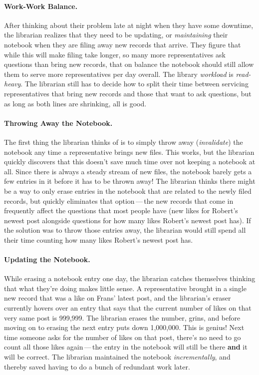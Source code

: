 \paragraph{Work-Work Balance.}
%
After thinking about their problem late at night when they have some downtime,
the librarian realizes that they need to be updating, or \textit{maintaining}
their notebook when they are filing away new records that arrive. They figure
that while this will make filing take longer, so many more representatives ask
questions than bring new records, that on balance the notebook should still
allow them to serve more representatives per day overall. The library
\textit{workload} is \textit{read-heavy}. The librarian still has to decide how
to split their time between servicing representatives that bring new records and
those that want to ask questions, but as long as both lines are shrinking, all
is good.

\paragraph{Throwing Away the Notebook.}
%
The first thing the librarian thinks of is to simply throw away
(\textit{invalidate}) the notebook any time a representative brings new files.
This works, but the librarian quickly discovers that this doesn't save much time
over not keeping a notebook at all. Since there is always a steady stream of new
files, the notebook barely gets a few entries in it before it has to be thrown
away! The librarian thinks there might be a way to only erase entries in the
notebook that are related to the newly filed records, but quickly eliminates
that option\,---\,the new records that come in frequently affect the questions
that most people have (new likes for Robert's newest post alongside questions
for how many likes Robert's newest post has). If the solution was to throw those
entries away, the librarian would still spend all their time counting how many
likes Robert's newest post has.

\paragraph{Updating the Notebook.}
%
While erasing a notebook entry one day, the librarian catches themselves
thinking that what they're doing makes little sense. A representative brought in
a single new record that was a like on Frans' latest post, and the librarian's
eraser currently hovers over an entry that says that the current number of likes
on that very same post is 999,999. The librarian erases the number, grins, and
before moving on to erasing the next entry puts down 1,000,000. This is genius!
Next time someone asks for the number of likes on that post, there's no need to
go count all those likes again\,---\,the entry in the notebook will still be
there \textbf{and} it will be correct. The librarian maintained the notebook
\textit{incrementally}, and thereby saved having to do a bunch of redundant work
later.

